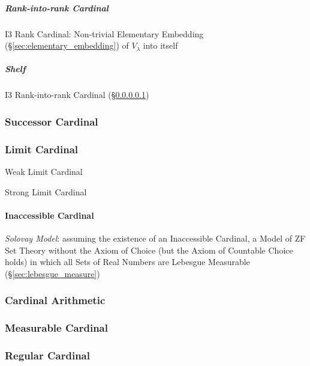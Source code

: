 \subparagraph{Rank-into-rank Cardinal}\label{sec:rank_into_rank}\hfill

I3 Rank Cardinal: Non-trivial Elementary Embedding
(\S\ref{sec:elementary_embedding}) of $V_\lambda$ into itself



\subparagraph{Shelf}\label{sec:shelf}

I3 Rank-into-rank Cardinal (\S\ref{sec:rank_into_rank})



\subsubsection{Successor Cardinal}\label{sec:successor_cardinal}



\subsubsection{Limit Cardinal}\label{sec:limit_cardinal}

Weak Limit Cardinal

Strong Limit Cardinal



\paragraph{Inaccessible Cardinal}\label{sec:inaccessible_cardinal}\hfill

\emph{Solovay Model}: assuming the existence of an Inaccessible Cardinal, a
Model of ZF Set Theory without the Axiom of Choice (but the Axiom of Countable
Choice holds) in which all Sets of Real Numbers are Lebesgue Measurable
(\S\ref{sec:lebesgue_measure})



\subsubsection{Cardinal Arithmetic}\label{sec:cardinal_arithmetic}

\subsubsection{Measurable Cardinal}\label{sec:measurable_cardinal}

\subsubsection{Regular Cardinal}\label{sec:regular_cardinal}

